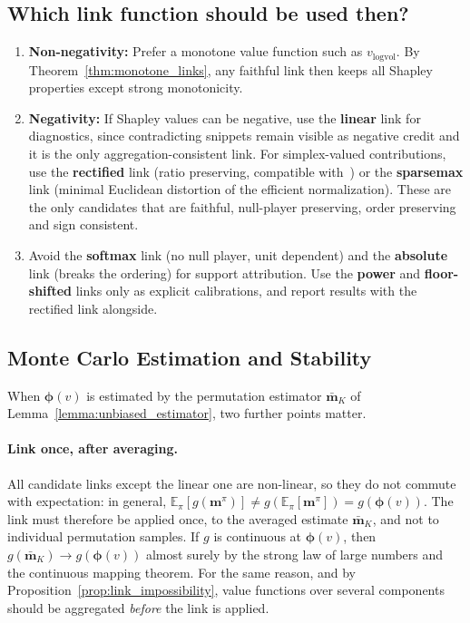 \subsection{Which link function should be used then?}
\begin{enumerate}
    \item{\bf Non-negativity:}  Prefer a monotone value function such as $v_{\text{logvol}}$. By Theorem~\ref{thm:monotone_links}, any faithful link then keeps all Shapley properties except strong monotonicity.
    \item{\bf Negativity:} If Shapley values can be negative, use the \textbf{linear} link for diagnostics, since contradicting snippets remain visible as negative credit and it is the only aggregation-consistent link. For simplex-valued contributions, use the \textbf{rectified} link (ratio preserving, compatible with~\cite{nematov2025source}) or the \textbf{sparsemax} link (minimal Euclidean distortion of the efficient normalization). These are the only candidates that are faithful, null-player preserving, order preserving and sign consistent.
    \item Avoid the \textbf{softmax} link (no null player, unit dependent) and the \textbf{absolute} link (breaks the ordering) for support attribution. Use the \textbf{power} and \textbf{floor-shifted} links only as explicit calibrations, and report results with the rectified link alongside.
\end{enumerate}

\subsection{Monte Carlo Estimation and Stability}
\label{subsec:link_stability}

When $\boldsymbol{\phi}(v)$ is estimated by the permutation estimator $\bar{\mathbf{m}}_K$ of Lemma~\ref{lemma:unbiased_estimator}, two further points matter.

\paragraph{Link once, after averaging.}
All candidate links except the linear one are non-linear, so they do not commute with expectation: in general, $\mathbb{E}_\pi[g(\mathbf{m}^\pi)] \neq g(\mathbb{E}_\pi[\mathbf{m}^\pi]) = g(\boldsymbol{\phi}(v))$. The link must therefore be applied once, to the averaged estimate $\bar{\mathbf{m}}_K$, and not to individual permutation samples. If $g$ is continuous at $\boldsymbol{\phi}(v)$, then $g(\bar{\mathbf{m}}_K) \to g(\boldsymbol{\phi}(v))$ almost surely by the strong law of large numbers and the continuous mapping theorem. For the same reason, and by Proposition~\ref{prop:link_impossibility}, value functions over several components should be aggregated \emph{before} the link is applied.


